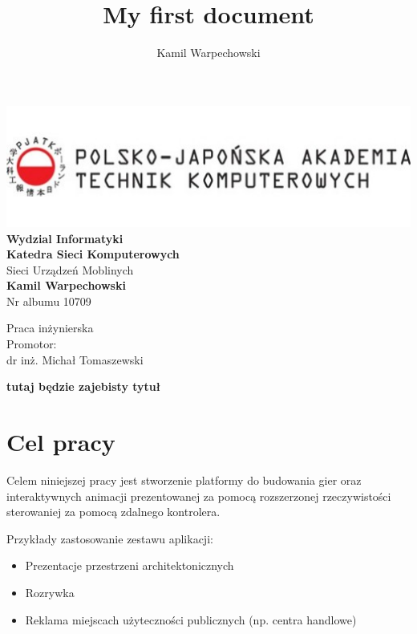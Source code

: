 \documentclass[12pt]{article}
\title{My first document}
\author{Kamil Warpechowski}
\begin{document}
\thispagestyle{firststyle}
\begin{center}
\includegraphics[width=1\textwidth]{images/logo.jpg}
\textbf{Wydzial Informatyki} \\
\vspace{3em}
\textbf{Katedra Sieci Komputerowych} \\
Sieci Urządzeń Moblinych \\
\vspace{3em}
\textbf{Kamil Warpechowski} \\
Nr albumu 10709
\end{center}


\vspace{3em}
{\addtolength{\leftskip}{70mm}

\noindent
Praca inżynierska
\\Promotor:
\\dr inż. Michał Tomaszewski

}

\vspace{3em}

\textbf {
	tutaj będzie zajebisty tytuł
}



  \newpage
  
  
  \tableofcontents
  \newpage
  

\section{Cel pracy}
Celem niniejszej pracy jest stworzenie platformy do budowania gier oraz interaktywnych animacji prezentowanej za pomocą rozszerzonej rzeczywistości sterowaniej za pomocą zdalnego kontrolera.

Przykłady zastosowanie zestawu aplikacji:

\begin{itemize}
\item Prezentacje przestrzeni architektonicznych
\item Rozrywka
\item Reklama miejscach użyteczności publicznych (np. centra handlowe)
\end{itemize}
\end{document}
